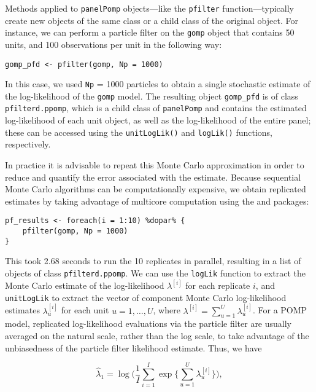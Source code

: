 Methods applied to \texttt{panelPomp} objects---like the \texttt{pfilter} function---typically create new objects of the same class or a child class of the original object.
For instance, we can perform a particle filter on the \texttt{gomp} object that contains 50 units, and 100 observations per unit in the following way:

\begin{verbatim}
gomp_pfd <- pfilter(gomp, Np = 1000)
\end{verbatim}

In this case, we used \texttt{Np} = 1000 particles to obtain a single stochastic estimate of the log-likelihood of the \texttt{gomp} model.
The resulting object \texttt{gomp\_pfd} is of class \texttt{pfilterd.ppomp}, which is a child class of \texttt{panelPomp} and contains the estimated log-likelihood of each unit object, as well as the log-likelihood of the entire panel;
these can be accessed using the \texttt{unitLogLik()} and \texttt{logLik()} functions, respectively.

In practice it is advisable to repeat this Monte Carlo approximation in order to reduce and quantify the error associated with the estimate.
Because sequential Monte Carlo algorithms can be computationally expensive, we obtain replicated estimates by taking advantage of multicore computation using the  \citep{foreach22} and  \citep{dopar22} packages:

\begin{verbatim}
pf_results <- foreach(i = 1:10) %dopar% {
    pfilter(gomp, Np = 1000)
}
\end{verbatim}

\noindent This took 2.68 seconds to run the 10 replicates in parallel, resulting in a list of objects of class \texttt{pfilterd.ppomp}.
We can use the \texttt{logLik} function to extract the Monte Carlo estimate of the log-likelihood \(\lambda^{[i]}\) for each replicate \(i\), and \texttt{unitLogLik} to extract the vector of component Monte Carlo log-likelihood estimates \(\lambda^{[i]}_{u}\) for each unit \(u=1,\dots,U\), where \(\lambda^{[i]}=\sum_{u=1}^{U}\lambda^{[i]}_{u}\).
For a POMP model, replicated log-likelihood evaluations via the particle filter are usually averaged on the natural scale, rather than the log scale, to take advantage of the unbiasedness of the particle filter likelihood estimate.
Thus, we have

\[
\hat{\lambda}_1 = \log \Big(\frac{1}{I}\sum_{i=1}^{I}
\exp
\big\{
  \sum_{u=1}^{U} \lambda^{[i]}_{u}
\big\}\Big),
\]

